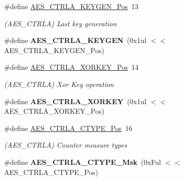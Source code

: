\begin{DoxyCompactItemize}
\item 
\hypertarget{group___s_a_m_l21___a_e_s_ga55ca29e4273692d315f1b00528d26e66}{}\#define \hyperlink{group___s_a_m_l21___a_e_s_ga55ca29e4273692d315f1b00528d26e66}{A\+E\+S\+\_\+\+C\+T\+R\+L\+A\+\_\+\+K\+E\+Y\+G\+E\+N\+\_\+\+Pos}~13\label{group___s_a_m_l21___a_e_s_ga55ca29e4273692d315f1b00528d26e66}

\begin{DoxyCompactList}\small\item\em (A\+E\+S\+\_\+\+C\+T\+R\+L\+A) Last key generation \end{DoxyCompactList}\item 
\hypertarget{group___s_a_m_l21___a_e_s_ga40b063ff72ea55cc0319e34aa3767113}{}\#define {\bfseries A\+E\+S\+\_\+\+C\+T\+R\+L\+A\+\_\+\+K\+E\+Y\+G\+E\+N}~(0x1ul $<$$<$ A\+E\+S\+\_\+\+C\+T\+R\+L\+A\+\_\+\+K\+E\+Y\+G\+E\+N\+\_\+\+Pos)\label{group___s_a_m_l21___a_e_s_ga40b063ff72ea55cc0319e34aa3767113}

\item 
\hypertarget{group___s_a_m_l21___a_e_s_gada84c7624ddefe20ad58bb1cb83e6a10}{}\#define \hyperlink{group___s_a_m_l21___a_e_s_gada84c7624ddefe20ad58bb1cb83e6a10}{A\+E\+S\+\_\+\+C\+T\+R\+L\+A\+\_\+\+X\+O\+R\+K\+E\+Y\+\_\+\+Pos}~14\label{group___s_a_m_l21___a_e_s_gada84c7624ddefe20ad58bb1cb83e6a10}

\begin{DoxyCompactList}\small\item\em (A\+E\+S\+\_\+\+C\+T\+R\+L\+A) Xor Key operation \end{DoxyCompactList}\item 
\hypertarget{group___s_a_m_l21___a_e_s_ga915933995c89d8a3b509e918dd152ddb}{}\#define {\bfseries A\+E\+S\+\_\+\+C\+T\+R\+L\+A\+\_\+\+X\+O\+R\+K\+E\+Y}~(0x1ul $<$$<$ A\+E\+S\+\_\+\+C\+T\+R\+L\+A\+\_\+\+X\+O\+R\+K\+E\+Y\+\_\+\+Pos)\label{group___s_a_m_l21___a_e_s_ga915933995c89d8a3b509e918dd152ddb}

\item 
\hypertarget{group___s_a_m_l21___a_e_s_ga0bfd0c90e0ee148b5a49d5d732a88caa}{}\#define \hyperlink{group___s_a_m_l21___a_e_s_ga0bfd0c90e0ee148b5a49d5d732a88caa}{A\+E\+S\+\_\+\+C\+T\+R\+L\+A\+\_\+\+C\+T\+Y\+P\+E\+\_\+\+Pos}~16\label{group___s_a_m_l21___a_e_s_ga0bfd0c90e0ee148b5a49d5d732a88caa}

\begin{DoxyCompactList}\small\item\em (A\+E\+S\+\_\+\+C\+T\+R\+L\+A) Counter measure types \end{DoxyCompactList}\item 
\hypertarget{group___s_a_m_l21___a_e_s_ga054686d9f1ccf568d62d0cf2d2e6f9c6}{}\#define {\bfseries A\+E\+S\+\_\+\+C\+T\+R\+L\+A\+\_\+\+C\+T\+Y\+P\+E\+\_\+\+Msk}~(0x\+Ful $<$$<$ A\+E\+S\+\_\+\+C\+T\+R\+L\+A\+\_\+\+C\+T\+Y\+P\+E\+\_\+\+Pos)\label{group___s_a_m_l21___a_e_s_ga054686d9f1ccf568d62d0cf2d2e6f9c6}


\end{DoxyCompactItemize}
